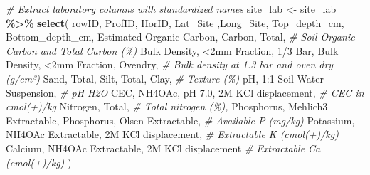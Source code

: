\documentclass[
  10pt,
  b5paper,
  oneside]{book}
\newenvironment{Shaded}{\begin{snugshade}}{\end{snugshade}}
\newcommand{\AttributeTok}[1]{\textcolor[rgb]{0.13,0.29,0.53}{#1}}
\newcommand{\CommentTok}[1]{\textcolor[rgb]{0.56,0.35,0.01}{\textit{#1}}}
\newcommand{\FunctionTok}[1]{\textcolor[rgb]{0.13,0.29,0.53}{\textbf{#1}}}
\newcommand{\NormalTok}[1]{#1}
\newcommand{\OtherTok}[1]{\textcolor[rgb]{0.56,0.35,0.01}{#1}}
\newcommand{\SpecialCharTok}[1]{\textcolor[rgb]{0.81,0.36,0.00}{\textbf{#1}}}
\newcommand{\StringTok}[1]{\textcolor[rgb]{0.31,0.60,0.02}{#1}}
\begin{document}
\begin{Shaded}
\begin{Highlighting}[]
\CommentTok{\# Extract laboratory columns with standardized names}
\NormalTok{site\_lab }\OtherTok{\textless{}{-}}\NormalTok{ site\_lab }\SpecialCharTok{\%\textgreater{}\%}
    \FunctionTok{select}\NormalTok{(}
\NormalTok{      rowID, ProfID, HorID, Lat\_Site ,Long\_Site, Top\_depth\_cm, Bottom\_depth\_cm,}
      \StringTok{\textasciigrave{}}\AttributeTok{Estimated Organic Carbon}\StringTok{\textasciigrave{}}\NormalTok{, }\StringTok{\textasciigrave{}}\AttributeTok{Carbon, Total}\StringTok{\textasciigrave{}}\NormalTok{,                                     }\CommentTok{\# Soil Organic Carbon and Total Carbon (\%)                    }
      \StringTok{\textasciigrave{}}\AttributeTok{Bulk Density, \textless{}2mm Fraction, 1/3 Bar}\StringTok{\textasciigrave{}}\NormalTok{, }\StringTok{\textasciigrave{}}\AttributeTok{Bulk Density, \textless{}2mm Fraction, Ovendry}\StringTok{\textasciigrave{}}\NormalTok{,  }\CommentTok{\# Bulk density at 1.3 bar and oven dry (g/cm³)}
      \StringTok{\textasciigrave{}}\AttributeTok{Sand, Total}\StringTok{\textasciigrave{}}\NormalTok{, }\StringTok{\textasciigrave{}}\AttributeTok{Silt, Total}\StringTok{\textasciigrave{}}\NormalTok{, }\StringTok{\textasciigrave{}}\AttributeTok{Clay}\StringTok{\textasciigrave{}}\NormalTok{,                                            }\CommentTok{\# Texture (\%)}
      \StringTok{\textasciigrave{}}\AttributeTok{pH, 1:1 Soil{-}Water Suspension}\StringTok{\textasciigrave{}}\NormalTok{,                                                 }\CommentTok{\# pH H2O}
      \StringTok{\textasciigrave{}}\AttributeTok{CEC, NH4OAc, pH 7.0, 2M KCl displacement}\StringTok{\textasciigrave{}}\NormalTok{,                                      }\CommentTok{\# CEC in cmol(+)/kg}
      \StringTok{\textasciigrave{}}\AttributeTok{Nitrogen, Total}\StringTok{\textasciigrave{}}\NormalTok{,                                                               }\CommentTok{\# Total nitrogen (\%),}
      \StringTok{\textasciigrave{}}\AttributeTok{Phosphorus, Mehlich3 Extractable}\StringTok{\textasciigrave{}}\NormalTok{, }\StringTok{\textasciigrave{}}\AttributeTok{Phosphorus, Olsen Extractable}\StringTok{\textasciigrave{}}\NormalTok{,             }\CommentTok{\# Available P (mg/kg)}
      \StringTok{\textasciigrave{}}\AttributeTok{Potassium, NH4OAc Extractable, 2M KCl displacement}\StringTok{\textasciigrave{}}\NormalTok{,                            }\CommentTok{\# Extractable K (cmol(+)/kg)}
      \StringTok{\textasciigrave{}}\AttributeTok{Calcium, NH4OAc Extractable, 2M KCl displacement}\StringTok{\textasciigrave{}}                               \CommentTok{\# Extractable Ca (cmol(+)/kg)}
\NormalTok{    )}


\end{Highlighting}
\end{Shaded}
\end{document}
